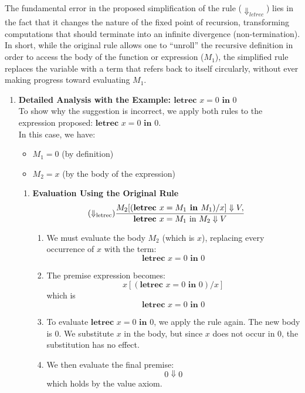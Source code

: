 \begin{solution}
The fundamental error in the proposed simplification of the rule ($\Downarrow_{letrec}$) lies in the fact that it changes the nature of the fixed point of recursion, transforming computations that should terminate into an infinite divergence (non-termination).
In short, while the original rule allows one to “unroll” the recursive definition in order to access the body of the function or expression ($M_1$), the simplified rule replaces the variable with a term that refers back to itself circularly, without ever making progress toward evaluating $M_1$.

\begin{enumerate}
    \item \textbf{Detailed Analysis with the Example: $\textbf{letrec } x = 0 \textbf{ in } 0$} 
    \\
    To show why the suggestion is incorrect, we apply both rules to the expression proposed: $\textbf{letrec } x = 0 \textbf{ in } 0$. \\
    In this case, we have:
    \begin{itemize}
        \item $M_1=0$ (by definition)
        \item $M_2=x$ (by the body of the expression)
    \end{itemize}
    \begin{enumerate}
        \item \textbf{Evaluation Using the Original Rule}\\
        \[(\Downarrow_{\text{letrec}})
\frac
{M_2[(\text{\textbf{letrec }} x = M_1 \text{\textbf{ in }} M_1)/x] \Downarrow  V, }
{\text{\textbf{letrec }} x = M_1 \text{ in } M_2 \Downarrow  V}
\]
\begin{enumerate}
    \item We must evaluate the body $M_2$ (which is $x$), replacing every occurrence of $x$ with the term:
\[\textbf{letrec } x = 0 \textbf{ in } 0\]
    \item The premise expression becomes: 
    \[x[(\textbf{letrec } x = 0 \textbf{ in } 0)/x]\]
    which is
    \[\textbf{letrec } x = 0 \textbf{ in } 0\]
    \item To evaluate $\textbf{letrec } x = 0 \textbf{ in } 0$, we apply the rule again. The new body is $0$. We substitute $x$ in the body, but since $x$ does not occur in $0$, the substitution has no effect.
    \item We then evaluate the final premise: \[0 \Downarrow 0\] which holds by the value axiom.

\end{enumerate}
\end{enumerate}
\end{enumerate}
\end{solution}
